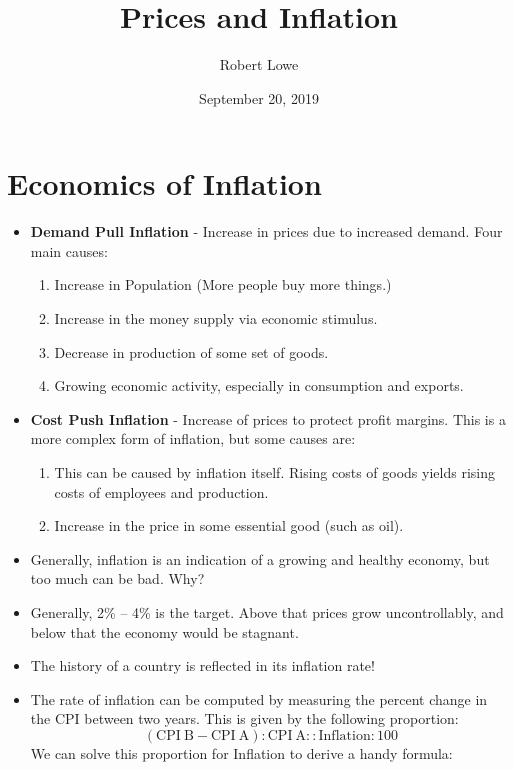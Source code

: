 \documentclass{article}
\title{Prices and Inflation}
\author{Robert Lowe}
\date{September 20, 2019}
\begin{document}
\maketitle
\setlength{\jot}{12pt}

\section*{Economics of Inflation}
\begin{itemize}
\item {\bf Demand Pull Inflation} - Increase in prices due to increased demand. Four main causes:
    \begin{enumerate}
        \item Increase in Population (More people buy more things.)
        \item Increase in the money supply via economic stimulus.
        \item Decrease in production of some set of goods.
        \item Growing economic activity, especially in consumption and exports.
    \end{enumerate}
\item {\bf Cost Push Inflation} - Increase of prices to protect profit margins. This is a more complex form of inflation, but some causes are:
    \begin{enumerate}
        \item This can be caused by inflation itself.  Rising costs of goods yields rising costs of employees and production.
        \item Increase in the price in some essential good (such as oil).
    \end{enumerate}
    \item Generally, inflation is an indication of a growing and healthy economy, but too much can be bad.  Why?
    \item Generally, 2\% -- 4\% is the target.  Above that prices grow uncontrollably, and below that the economy would be stagnant.
    \item The history of a country is reflected in its inflation rate!
    \item The rate of inflation can be computed by measuring the percent change in the CPI between two years.  This is given by the following proportion:
    \[
    \mathrm{(CPI\ B-CPI\ A):CPI\ A :: Inflation : 100}
    \]
    We can solve this proportion for Inflation to derive a handy formula:
    

\end{itemize}
\end{document}
